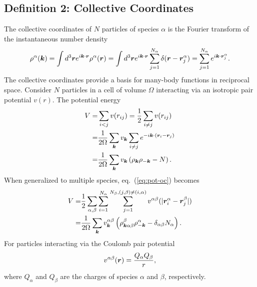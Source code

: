 \subsection{Definition 2: Collective Coordinates}
The collective coordinates of $N$ particles of species $\alpha$ is the Fourier transform of the instantaneous number density
\begin{align}
\rho^\alpha(\boldsymbol{k}) = \int d^3\boldsymbol{r} e^{i\boldsymbol{k}\cdot\boldsymbol{r}} \rho^\alpha(\boldsymbol{r})
= \int d^3\boldsymbol{r} e^{i\boldsymbol{k}\cdot\boldsymbol{r}} \sum\limits_{j=1}^{N_\alpha} \delta(\boldsymbol{r}-\boldsymbol{r}^\alpha_j)=\sum\limits_{j=1}^{N_\alpha} e^{i\boldsymbol{k}\cdot\boldsymbol{r}_j^\alpha}. \label{eq:rhok}
\end{align}
The collective coordinates provide a basis for many-body functions in reciprocal space. Consider $N$ particles in a cell of volume $\Omega$ interacting via an isotropic pair potential $v(r)$. The potential energy
\begin{align}
V =& \sum\limits_{i<j} v(r_{ij}) = \frac{1}{2} \sum\limits_{i\neq j} v(r_{ij}) \nonumber \\
=& \frac{1}{2\Omega} \sum\limits_{\boldsymbol{k}}v_{\boldsymbol{k}} \sum\limits_{i\neq j}   e^{-i\boldsymbol{k}\cdot(\boldsymbol{r}_i-\boldsymbol{r}_j)} \nonumber \\
=& \frac{1}{2\Omega} \sum\limits_{\boldsymbol{k}}v_{\boldsymbol{k}} \left( \rho_{\boldsymbol{k}}\rho_{-\boldsymbol{k}}-N \right). \label{eq:pot-oc}
\end{align}
When generalized to multiple species, eq.~(\ref{eq:pot-oc}) becomes
\begin{align}
V =& \frac{1}{2}\sum\limits_{\alpha, \beta} \sum\limits_{i=1}^{N_\alpha} \sum\limits_{j=1}^{N_\beta, (j,\beta)\neq(i,\alpha)} v^{\alpha\beta}(\vert\boldsymbol{r}_i^\alpha - \boldsymbol{r}_j^\beta \vert) \nonumber \\
=& \frac{1}{2\Omega} \sum\limits_{\boldsymbol{k}}
v^{\alpha\beta}_{\boldsymbol{k}} \left( \rho^\beta_{\boldsymbol{k}\alpha\beta}\rho^\alpha_{-\boldsymbol{k}}-\delta_{\alpha\beta}N_\alpha \right). \label{eq:pot-mc}
\end{align}
For particles interacting via the Coulomb pair potential
\begin{align}
v^{\alpha\beta}(\boldsymbol{r}) = \frac{Q_\alpha Q_\beta}{r},
\end{align}
where $Q_\alpha$ and $Q_\beta$ are the charges of species $\alpha$ and $\beta$, respectively.

